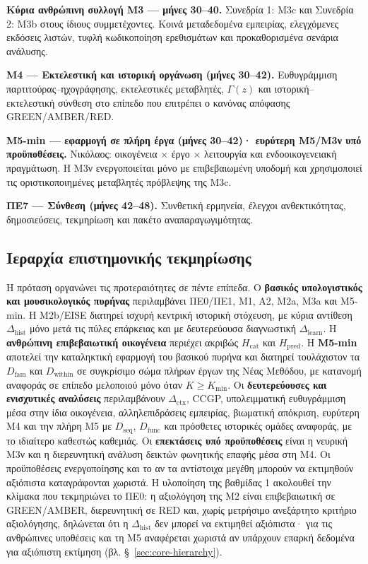 \documentclass[11pt,a4paper]{article}
\begin{document}
\textbf{Κύρια ανθρώπινη συλλογή M3 --- μήνες 30--40.} Συνεδρία 1: M3c και Συνεδρία 2: M3b στους ίδιους συμμετέχοντες. Κοινά μεταδεδομένα εμπειρίας, ελεγχόμενες εκδόσεις λιστών, τυφλή κωδικοποίηση ερεθισμάτων και προκαθορισμένα σενάρια ανάλυσης.

\textbf{M4 --- Εκτελεστική και ιστορική οργάνωση (μήνες 30--42).} Ευθυγράμμιση παρτιτούρας--ηχογράφησης, εκτελεστικές μεταβλητές, $\Gamma(z)$ και ιστορική–εκτελεστική σύνθεση στο επίπεδο που επιτρέπει ο κανόνας απόφασης GREEN/AMBER/RED.

\textbf{M5-min --- εφαρμογή σε πλήρη έργα (μήνες 30--42)· ευρύτερη Μ5/M3ν υπό προϋποθέσεις.} Νικόλαος: οικογένεια $\times$ έργο $\times$ λειτουργία και ενδοοικογενειακή πραγμάτωση. Η M3ν ενεργοποιείται μόνο με επιβεβαιωμένη υποδομή και χρησιμοποιεί τις οριστικοποιημένες μεταβλητές πρόβλεψης της M3c.

\textbf{ΠΕ7 --- Σύνθεση (μήνες 42--48).} Συνθετική ερμηνεία, έλεγχοι ανθεκτικότητας, δημοσιεύσεις, τεκμηρίωση και πακέτο αναπαραγωγιμότητας.

\subsection{Ιεραρχία επιστημονικής τεκμηρίωσης}\label{app:impl-evidence}

Η πρόταση οργανώνει τις προτεραιότητες σε πέντε επίπεδα. Ο \textbf{βασικός υπολογιστικός και μουσικολογικός πυρήνας} περιλαμβάνει ΠΕ0/ΠΕ1, Μ1, Α2, Μ2a, Μ3a και Μ5-min. Η Μ2b/EISE διατηρεί ισχυρή κεντρική ιστορική στόχευση, με κύρια αντίθεση $\Delta_{\mathrm{hist}}$ μόνο μετά τις πύλες επάρκειας και με δευτερεύουσα διαγνωστική $\Delta_{\mathrm{learn}}$. Η \textbf{ανθρώπινη επιβεβαιωτική οικογένεια} περιέχει ακριβώς $H_{\mathrm{cat}}$ και $H_{\mathrm{pred}}$. Η \textbf{M5-min} αποτελεί την καταληκτική εφαρμογή του βασικού πυρήνα και διατηρεί τουλάχιστον τα $D_{\mathrm{fam}}$ και $D_{\mathrm{within}}$ σε συγκρίσιμο σώμα πλήρων έργων της Νέας Μεθόδου, με κατανομή αναφοράς σε επίπεδο μελοποιού μόνο όταν $K\ge K_{\min}$. Οι \textbf{δευτερεύουσες και ενισχυτικές αναλύσεις} περιλαμβάνουν $\Delta_{\mathrm{ctx}}$, CCGP, υπολειμματική ευθυγράμμιση μέσα στην ίδια οικογένεια, αλληλεπιδράσεις εμπειρίας, βιωματική απόκριση, ευρύτερη M4 και την πλήρη M5 με $D_{\mathrm{seq}}$, $D_{\mathrm{func}}$ και πρόσθετες ιστορικές ομάδες αναφοράς, με το ιδιαίτερο καθεστώς καθεμιάς. Οι \textbf{επεκτάσεις υπό προϋποθέσεις} είναι η νευρική M3ν και η διερευνητική ανάλυση δεικτών φωνητικής επαφής μέσα στη M4. Οι προϋποθέσεις ενεργοποίησης και το αν τα αντίστοιχα μεγέθη μπορούν να εκτιμηθούν αξιόπιστα καταγράφονται χωριστά. Η υλοποίηση της βαθμίδας 1 ακολουθεί την κλίμακα που τεκμηριώνει το ΠΕ0: η αξιολόγηση της M2 είναι επιβεβαιωτική σε GREEN/AMBER, διερευνητική σε RED και, χωρίς μετρήσιμο ανεξάρτητο κριτήριο αξιολόγησης, δηλώνεται ότι η $\Delta_{\mathrm{hist}}$ δεν μπορεί να εκτιμηθεί αξιόπιστα· για τις ανθρώπινες υποθέσεις και τη M5 αναφέρεται χωριστά αν υπάρχουν επαρκή δεδομένα για αξιόπιστη εκτίμηση (βλ. §~\ref{sec:core-hierarchy}).
\end{document}
